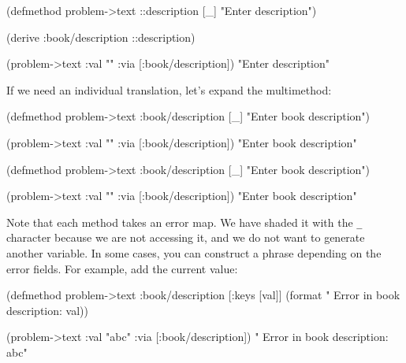 \else

  \begin{clojure}
(defmethod problem->text ::description [_]
  "Enter description")

(derive :book/description ::description)

(problem->text {:val "" :via [:book/description]})
"Enter description"
  \end{clojure}

\fi

\noindent
If we need an individual translation, let's expand the multimethod:

\ifx\DEVICETYPE\MOBILE

  \begin{clojure}
(defmethod problem->text
  :book/description [_]
  "Enter book description")

(problem->text
  {:val "" :via [:book/description]})
"Enter book description"
  \end{clojure}

\else

  \begin{clojure}
(defmethod problem->text :book/description [_]
  "Enter book description")

(problem->text {:val "" :via [:book/description]})
"Enter book description"
  \end{clojure}

\fi


Note that each method takes an error map. We have shaded it with the \verb|_| character because we are not accessing it, and we do not want to generate another variable. In some cases, you can construct a phrase depending on the error fields. For example, add the current value:

\ifx\DEVICETYPE\MOBILE

  \begin{clojure}
(defmethod problem->text
  :book/description
  [{:keys [val]}]
  (format  " Error in book description: %
    val))

(problem->text
  {:val "abc" :via [:book/description]})
" Error in book description: abc"
  \end{clojure}


